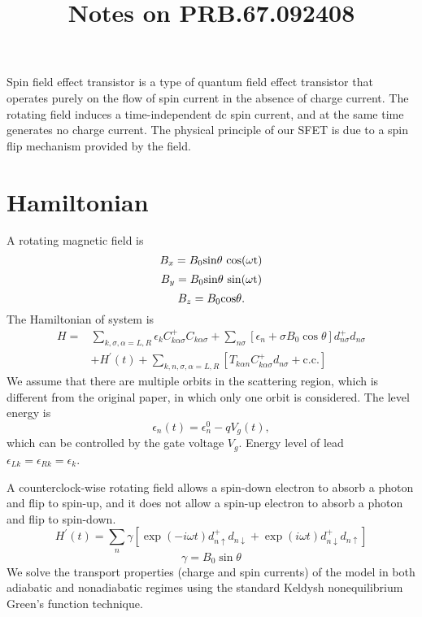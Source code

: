 \documentclass[11pt,a4paper]{article}
\begin{document}
\title{Notes on PRB.67.092408}
\date{}
\maketitle

Spin field effect transistor is a type of quantum field effect transistor that operates purely on the flow of spin current in the absence of charge current. The rotating field induces a time-independent dc spin current, and at the same time generates no charge current. The physical principle of our SFET is due to a spin flip mechanism provided by the field.
\section{Hamiltonian}
A rotating magnetic field is
\begin{equation}
B_{x} = B_{0}\rm{sin}\theta ~\rm{cos}(\omega t)
\end{equation}
\begin{equation}
B_{y} = B_{0}\rm{sin}\theta~\rm{sin}(\omega t)
\end{equation}
\begin{equation}
B_{z} = B_{0}\rm{cos}\theta.
\end{equation}
The Hamiltonian of system is
\begin{equation}
\begin{split}
H=&\sum_{k, \sigma, \alpha=L, R} \epsilon_{k} C_{k \alpha \sigma}^{+} C_{k \alpha \sigma}+\sum_{n\sigma}\left[\epsilon_{n}+\sigma B_{0} \cos \theta\right] d_{n\sigma}^{+} d_{n\sigma}\\
&+H^{\prime}(t)+\sum_{k,n, \sigma, \alpha=L, R}\left[T_{k \alpha n} C_{k \alpha \sigma}^{+} d_{n\sigma}+\mathrm{c.c.}\right]
\end{split}
\end{equation}
We assume that there are multiple orbits in the scattering region, which is different from the original paper, in which only one orbit is considered. The level energy is
\begin{equation}
\epsilon_{n}(t) = \epsilon_{n}^{0} -qV_{g}(t),
\end{equation}
which can be controlled by the gate voltage $V_{g}$. Energy level of lead $\epsilon_{Lk} = \epsilon_{Rk} = \epsilon_{k}$.

A counterclock-wise rotating field allows a spin-down electron to absorb a photon and flip to spin-up, and it does not allow a spin-up electron to absorb a photon and flip to spin-down.
\begin{equation}
H^{\prime}(t)=\sum_{n}\gamma\left[\exp (-i \omega t) d_{n\uparrow}^{+} d_{n\downarrow}+\exp (i \omega t) d_{n\downarrow}^{+} d_{n\uparrow}\right]
\end{equation}
\begin{equation}
\gamma=B_{0} \sin \theta
\end{equation}
We solve the transport properties (charge and spin currents) of the model in both adiabatic and nonadiabatic regimes using the standard Keldysh nonequilibrium Green’s function technique.
\end{document}
